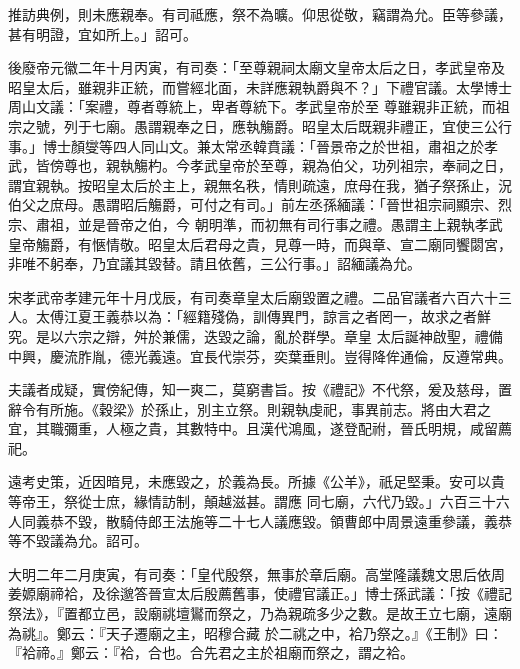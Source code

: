 \begin{pinyinscope}
 推訪典例，則未應親奉。有司祗應，祭不為曠。仰思從敬，竊謂為允。臣等參議，甚有明證，宜如所上。」詔可。



 後廢帝元徽二年十月丙寅，有司奏：「至尊親祠太廟文皇帝太后之日，孝武皇帝及昭皇太后，雖親非正統，而嘗經北面，未詳應親執爵與不？」下禮官議。太學博士周山文議：「案禮，尊者尊統上，卑者尊統下。孝武皇帝於至
 尊雖親非正統，而祖宗之號，列于七廟。愚謂親奉之日，應執觴爵。昭皇太后既親非禮正，宜使三公行事。」博士顏燮等四人同山文。兼太常丞韓賁議：「晉景帝之於世祖，肅祖之於孝武，皆傍尊也，親執觴杓。今孝武皇帝於至尊，親為伯父，功列祖宗，奉祠之日，謂宜親執。按昭皇太后於主上，親無名秩，情則疏遠，庶母在我，猶子祭孫止，況伯父之庶母。愚謂昭后觴爵，可付之有司。」前左丞孫緬議：「晉世祖宗祠顯宗、烈宗、肅祖，並是晉帝之伯，今
 朝明準，而初無有司行事之禮。愚謂主上親執孝武皇帝觴爵，有愜情敬。昭皇太后君母之貴，見尊一時，而與章、宣二廟同饗閟宮，非唯不躬奉，乃宜議其毀替。請且依舊，三公行事。」詔緬議為允。



 宋孝武帝孝建元年十月戊辰，有司奏章皇太后廟毀置之禮。二品官議者六百六十三人。太傅江夏王義恭以為：「經籍殘偽，訓傳異門，諒言之者罔一，故求之者鮮究。是以六宗之辯，舛於兼儒，迭毀之論，亂於群學。章皇
 太后誕神啟聖，禮備中興，慶流胙胤，德光義遠。宜長代崇芬，奕葉垂則。豈得降侔通倫，反遵常典。



 夫議者成疑，實傍紀傳，知一爽二，莫窮書旨。按《禮記》不代祭，爰及慈母，置辭令有所施。《穀梁》於孫止，別主立祭。則親執虔祀，事異前志。將由大君之宜，其職彌重，人極之貴，其數特中。且漢代鴻風，遂登配祔，晉氏明規，咸留薦祀。



 遠考史策，近因暗見，未應毀之，於義為長。所據《公羊》，祇足堅秉。安可以貴等帝王，祭從士庶，緣情訪制，顛越滋甚。謂應
 同七廟，六代乃毀。」六百三十六人同義恭不毀，散騎侍郎王法施等二十七人議應毀。領曹郎中周景遠重參議，義恭等不毀議為允。詔可。



 大明二年二月庚寅，有司奏：「皇代殷祭，無事於章后廟。高堂隆議魏文思后依周姜嫄廟禘袷，及徐邈答晉宣太后殷薦舊事，使禮官議正。」博士孫武議：「按《禮記祭法》，『置都立邑，設廟祧壇鸑而祭之，乃為親疏多少之數。是故王立七廟，遠廟為祧』。鄭云：『天子遷廟之主，昭穆合藏
 於二祧之中，袷乃祭之。』《王制》曰：『袷禘。』鄭云：『袷，合也。合先君之主於祖廟而祭之，謂之袷。




\end{pinyinscope}
